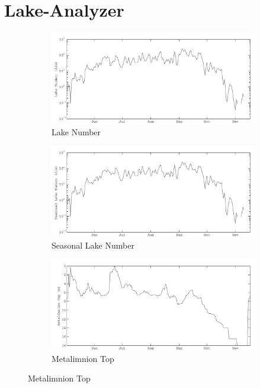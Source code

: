 \chapter{Lake-Analyzer}
	\def\lafigsize{.49\textwidth}
	\begin{figure}
		\centering
		\begin{subfigure}{\lafigsize}
			\caption{Lake Number}
			\includegraphics[width=\textwidth]{figures/Sparkling_Ln.pdf}
		\end{subfigure}
		\begin{subfigure}{\lafigsize}
			\caption{Seasonal Lake Number}
			\includegraphics[width=\textwidth]{figures/Sparkling_SLn.pdf}
		\end{subfigure}
		\begin{subfigure}{\lafigsize}
			\caption{Metalimnion Top}
			\includegraphics[width=\textwidth]{figures/Sparkling_metaT.pdf}

\end{subfigure}
\end{figure}
